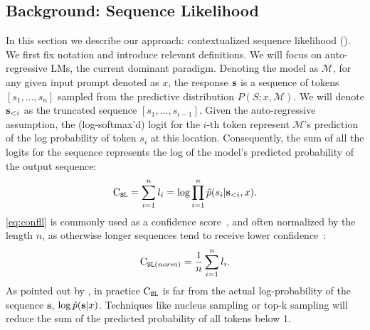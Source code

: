 \subsection{Background: Sequence Likelihood}

In this section we describe our approach: contextualized sequence likelihood (\methodname). 
We first fix notation and introduce relevant definitions. %
We will focus on auto-regressive LMs, the current dominant paradigm.
Denoting the model as $\mathcal{M}$, for any given input prompt denoted as $x$, the response $\mathbf{s}$ is a sequence of tokens $[s_1,\ldots,s_n]$ sampled from the predictive distribution $P(S;x,\mathcal{M})$.
We will denote $\mathbf{s}_{<i}$ as the truncated sequence $[s_1,\ldots,s_{i-1}]$.
Given the auto-regressive assumption, the (log-softmax'd) logit for the $i$-th token represent $\mathcal{M}$'s prediction of the log probability of token $s_i$ at this location. %
Consequently, the sum of all the logits for the sequence represents the log of the model's predicted probability of the output sequence:
\begin{align}
    \text{C}_{\texttt{SL}} = \sum_{i=1}^n l_i = \log{\prod_{i=1}^n \hat{p}(s_i|\mathbf{s}_{<i},x)}\label{eq:confll}.
\end{align}
\cref{eq:confll} is commonly used as a confidence score~\cite{quach2023conformal,cole2023selectively}, and often normalized by the length $n$, as otherwise longer sequences tend to receive lower confidence~\citep{kuhn2023semantic,malinin2021uncertainty}:
\begin{align}
    \text{C}_{\texttt{SL}(norm)} = \frac{1}{n} \sum_{i=1}^n l_i\label{eq:confll:norm}.
\end{align}
As pointed out by \citet{cole2023selectively}, in practice $\text{C}_{\texttt{SL}}$ is far from the actual log-probability of the sequence $\mathbf{s}$, $\log{\hat{p}(\mathbf{s}|x)}$.
Techniques like nucleus sampling or top-k sampling will reduce the sum of the predicted probability of all tokens below 1. %
